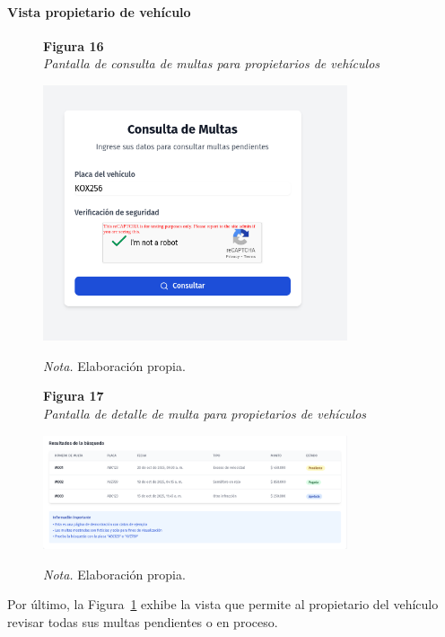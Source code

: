  \paragraph{Vista propietario de vehículo}
 \begin{figure}[htbp]
    \begin{flushleft}
        \textbf{Figura 16}\\[2em]
        \textit{Pantalla de consulta de multas para propietarios de vehículos}
    \end{flushleft}
    \vspace{1em}
    \centering
    \includegraphics[width=0.8\textwidth]{Images/UI5.png}
    \vspace{2em}
    \begin{flushleft}
        \textit{Nota.} Elaboración propia.
    \end{flushleft}
    \label{fig:consulta_multas_propietario}
\end{figure}
\begin{figure}[htbp]
    \begin{flushleft}
        \textbf{Figura 17}\\[2em]
        \textit{Pantalla de detalle de multa para propietarios de vehículos}
    \end{flushleft}
    \vspace{1em}
    \centering
    \includegraphics[width=0.8\textwidth]{Images/UI6.png}
    \vspace{2em}
    \begin{flushleft}
        \textit{Nota.} Elaboración propia.
    \end{flushleft}
    \label{fig:detalle_multa_propietario}
\end{figure}
Por último, la Figura~\ref{fig:consulta_multas_propietario} exhibe la vista que permite al propietario del vehículo revisar todas sus multas pendientes o en proceso.